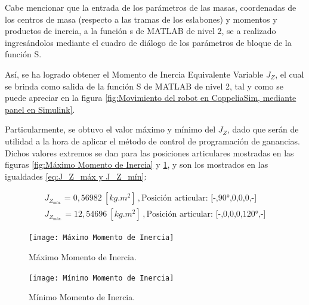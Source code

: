 \documentclass{article}
\begin{document}
\begin{sloppypar}
Cabe mencionar que la entrada de los parámetros de las masas, coordenadas de los centros de masa (respecto a las tramas de los eslabones) y momentos y productos de inercia, a la función s de MATLAB de nivel 2, se a realizado ingresándolos mediante el cuadro de diálogo de los parámetros de bloque \cite{Pass_Dialog_Parameters} de la función S.

Así, se ha logrado obtener el Momento de Inercia Equivalente Variable $J_Z$, el cual se brinda como salida de la función S de MATLAB de nivel 2, tal y como se puede apreciar en la figura \ref{fig:Movimiento del robot en CoppeliaSim, mediante panel en Simulink}.

Particularmente, se obtuvo el valor máximo y mínimo del $J_Z$, dado que serán de utilidad a la hora de aplicar el método de control de programación de ganancias. Dichos valores extremos se dan para las posiciones articulares mostradas en las figuras \ref{fig:Máximo Momento de Inercia} y \ref{fig:Mínimo Momento de Inercia}, y son los mostrados en las igualdades \ref{eq:J_Z_máx y J_Z_mín}:

\begin{subequations} \label{eq:J_Z_máx y J_Z_mín}
	\begin{align}
        J_{Z_{\text{mín.}}} =  0,56982 ~[kg.m^2] \,, \text{Posición articular: [-,90°,0,0,0,-]}
        \\
        J_{Z_{\text{máx.}}} = 12,54696 ~[kg.m^2] \,, \text{Posición articular: [-,0,0,0,120°,-]}
    \end{align}
\end{subequations}

\begin{figure}[H]
    \centering
    \begin{minipage}{.5\textwidth}
        \centering
        \texttt{[image: Máximo Momento de Inercia]}
        \caption{Máximo Momento de Inercia.}
        \label{fig:Máximo Momento de Inercia}
    \end{minipage}%
    \begin{minipage}{.5\textwidth}
        \centering
        \texttt{[image: Mínimo Momento de Inercia]}
        \caption{Mínimo Momento de Inercia.}
        \label{fig:Mínimo Momento de Inercia}
    \end{minipage}
\end{figure}




\end{sloppypar}
\end{document}
